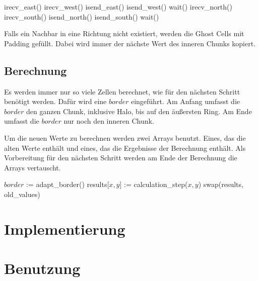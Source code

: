 \documentclass[12pt]{article}
\begin{document}
\begin{algorithmic}[1]
    \State irecv\_east()
    \State irecv\_west()
    \State isend\_east()
    \State isend\_west()
    \State wait()
    \State irecv\_north()
    \State irecv\_south()
    \State isend\_north()
    \State isend\_south()
    \State wait()
\end{algorithmic}

Falls ein Nachbar in eine Richtung nicht existiert, werden die Ghost Cells mit Padding gefüllt. Dabei wird immer der nächste Wert des inneren Chunks kopiert.

\subsection{Berechnung}
Es werden immer nur so viele Zellen berechnet, wie für den nächsten Schritt benötigt werden. Dafür wird eine $border$ eingeführt.
Am Anfang umfasst die $border$ den ganzen Chunk, inklusive Halo, bis auf den äußersten Ring. Am Ende umfasst die $border$ nur noch den inneren Chunk.

Um die neuen Werte zu berechnen werden zwei Arrays benutzt. Eines, das die alten Werte enthält und eines, das die Ergebnisse der Berechnung enthält. Als Vorbereitung für den nächsten Schritt werden am Ende der Berechnung die Arrays vertauscht.

\begin{algorithmic}[1]
    \State $border$ := adapt\_border()
        \State results[$x,y$] := calculation\_step($x,y$) 
    \EndFor
    \State swap(results, old\_values)
\end{algorithmic}

\section{Implementierung}


\section{Benutzung}


\typeout{}
\clearpage
\pagestyle{empty}

\listoffigures
\listoftables
\appendix
% 
\end{document}
